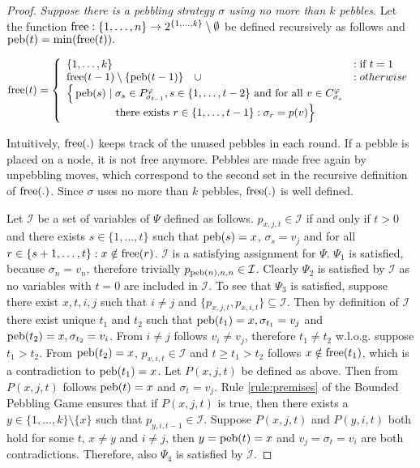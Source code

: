 \begin{proof}
\emph{Suppose there is a pebbling strategy $\sigma$ using no more than $k$ pebbles}. Let the function $\operatorname{free}: \{1,\ldots,n\} \rightarrow 2^{\{1,\ldots,k\}} \setminus \emptyset$ be defined recursively as follows and $\operatorname{peb}(t) = \min(\operatorname{free}(t)).$

$$
\free(t) = \left\{
  \begin{array}{ll}
    \{1,\ldots,k\} & : \text{if } t = 1\\
    \free(t-1) \setminus \{\peb(t-1)\} \quad \cup & : otherwise\\
		\Big\{\peb(s) \mid \sigma_{s} \in \Premises{\sigma_{t-1}}{\varphi}, s \in \{1,\ldots,t-2\} \text{ and for all } v \in \Children{\sigma_{s}}{\varphi}&\\
		\phantom{\Big\{\peb(s) \mid}\text{ there exists } r \in \{1,\ldots,t-1\}: \sigma_{r} = p(v) \Big\}&
  \end{array}
\right.
$$

Intuitively, $\operatorname{free}(.)$ keeps track of the unused pebbles in each round.
If a pebble is placed on a node, it is not free anymore.
Pebbles are made free again by unpebbling moves, which correspond to the second set in the recursive definition of $\operatorname{free}(.)$.
Since $\sigma$ uses no more than $k$ pebbles, $\operatorname{free}(.)$ is well defined.

Let $\mathcal{I}$ be a set of variables of $\Psi$ defined as follows.
$p_{x,j,t} \in \mathcal{I}$ if and only if $t > 0$ and there exists $s \in \{1,\ldots,t\}$ such that $\operatorname{peb}(s) = x$, $\sigma_s = v_j$ and for all $r \in \{s+1,\ldots,t\}: x \notin \operatorname{free}(r)$.
$\mathcal{I}$ is a satisfying assignment for $\Psi$.
$\Psi_1$ is satisfied, because $\sigma_n = v_n$, therefore trivially $p_{\operatorname{peb}(n),n,n} \in \mathcal{I}$.
Clearly $\Psi_2$ is satisfied by $\mathcal{I}$ as no variables with $t = 0$ are included in $\mathcal{I}$.
To see that $\Psi_3$ is satisfied, suppose there exist $x,t,i,j$ such that $i \neq j$ and $\{p_{x,j,t},p_{x,i,t}\} \subseteq \mathcal{I}$.
Then by definition of $\mathcal{I}$ there exist unique $t_1$ and $t_2$ such that $\operatorname{peb}(t_1) = x, \sigma_{t_1} = v_j$ and $\operatorname{peb}(t_2) = x, \sigma_{t_2} = v_i$.
From $i \neq j$ follows $v_i \neq v_j$, therefore $t_1 \neq t_2$ w.l.o.g. suppose $t_1 > t_2$.
From $\operatorname{peb}(t_2) = x$, $p_{x,i,t} \in \mathcal{I}$ and $t \geq t_1 > t_2$ follows $x \notin \operatorname{free}(t_1)$, which is a contradiction to $\operatorname{peb}(t_1) = x$.
Let $P(x,j,t)$ be defined as above. Then from $P(x,j,t)$ follows $\operatorname{peb}(t) = x$ and $\sigma_t = v_j$.
Rule \ref{rule:premises} of the Bounded Pebbling Game ensures that if $P(x,j,t)$ is true, then there exists a $y \in \{1,\ldots,k\} \setminus \{x\}$ such that $p_{y,i,t-1} \in \mathcal{I}$.
Suppose $P(x,j,t)$ and $P(y,i,t)$ both hold for some $t$, $x \neq y$ and $i \neq j$, then $y = \operatorname{peb}(t) = x$ and $v_j = \sigma_t = v_i$ are both contradictions. 
Therefore, also $\Psi_4$ is satisfied by $\mathcal{I}$.

\end{proof}